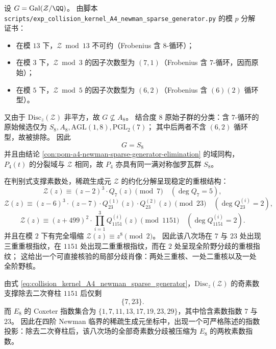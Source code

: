 \begin{conclusion}\label{con:pom-a4-newman-sparse-galois-s8}
设 \(G=\mathrm{Gal}(\mathcal Z/\QQ)\)。
由脚本 \texttt{scripts/exp\_collision\_kernel\_A4\_newman\_sparse\_generator.py} 的模 \(p\) 分解证书：
\begin{itemize}
  \item 在模 \(13\) 下，\(\mathcal Z\bmod 13\) 不可约（Frobenius 含 \(8\)-循环）；
  \item 在模 \(3\) 下，\(\mathcal Z\bmod 3\) 的因子次数型为 \((7,1)\)（Frobenius 含 \(7\)-循环，因而原始）；
  \item 在模 \(5\) 下，\(\mathcal Z\bmod 5\) 的因子次数型为 \((6,2)\)（Frobenius 含 \((6)(2)\) 循环型）。
\end{itemize}
又由于 \(\mathrm{Disc}_z(\mathcal Z)\) 非平方，故 \(G\nsubseteq A_8\)。
结合度 \(8\) 原始子群的分类：含 \(7\)-循环的原始候选仅为 \(S_8,A_8,\mathrm{AGL}(1,8),\mathrm{PGL}_2(7)\)；
其中后两者不含 \((6,2)\) 循环型，故被排除。
因此
\[
\boxed{\;G=S_8\;}
\]
并且由结论 \ref{con:pom-a4-newman-sparse-generator-elimination} 的域同构，\(P_4(t)\) 的分裂域与 \(\mathcal Z\) 相同，故 \(P_4\) 亦具有同一满对称伽罗瓦群 \(S_8\)。
\end{conclusion}

\begin{conclusion}\label{con:pom-a4-newman-ramification-portrait}
在判别式支撑素数处，稀疏生成元 \(\mathcal Z\) 的约化分解呈现稳定的重根结构：
\[
\mathcal Z(z)\equiv (z-2)^3\cdot Q_7(z)\pmod 7\quad(\deg Q_7=5),
\]
\[
\mathcal Z(z)\equiv (z-6)^3\cdot(z-7)\cdot Q_{23}^{(1)}(z)\cdot Q_{23}^{(2)}(z)\pmod{23}\quad(\deg Q_{23}^{(i)}=2),
\]
\[
\mathcal Z(z)\equiv (z+499)^2\cdot\prod_{i=1}^{3}Q_{1151}^{(i)}(z)\pmod{1151}\quad(\deg Q_{1151}^{(i)}=2).
\]
并且在模 \(2\) 下有完全塌缩 \(\mathcal Z(z)\equiv z^8\pmod 2\)。
因此该八次场在 \(7\) 与 \(23\) 处出现三重重根指纹，在 \(1151\) 处出现二重重根指纹，而在 \(2\) 处呈现全阶野分歧的重根指纹；
这给出一个可直接核验的局部分歧肖像：两处三重核、一处二重核以及一处全阶野核。
\end{conclusion}

\begin{conclusion}\label{con:pom-a4-newman-e8-exponent-shadow}
由式 \eqref{eq:collision_kernel_A4_newman_sparse_generator}，\(\mathrm{Disc}_z(\mathcal Z)\) 的奇素数支撑除去二次脊柱 \(1151\) 后仅剩
\[
\{7,23\}.
\]
而 \(E_8\) 的 Coxeter 指数集合为 \(\{1,7,11,13,17,19,23,29\}\)，其中恰含素数指数 \(7\) 与 \(23\)。
因此在四阶 Newman 临界的稀疏生成元坐标中，出现一个可严格陈述的指数投影：除去二次脊柱后，该八次场的全部奇素数分歧被压缩为 \(E_8\) 的两枚素数指数。
\end{conclusion}

